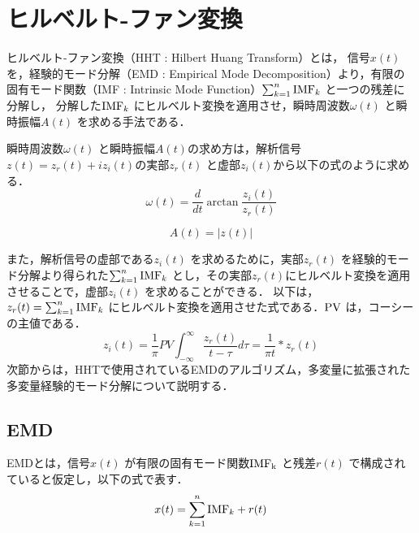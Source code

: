 \chapter{ヒルベルト-ファン変換}
%
ヒルベルト-ファン変換（HHT : Hilbert Huang Transform）とは，
信号$x(t)$ を，経験的モード分解（EMD : Empirical Mode Decomposition）より，有限の固有モード関数（IMF : Intrinsic Mode Function）$\sum_{k=1}^{n}{\rm{IMF}}_{k}$ と一つの残差に分解し，
分解した${\rm{IMF}}_{k}$ にヒルベルト変換を適用させ，瞬時周波数$\omega(t)$ と瞬時振幅$A(t)$ を求める手法である．
%

瞬時周波数$\omega(t)$ と瞬時振幅$A(t)$の求め方は，解析信号$z(t) = z_{r}(t) + iz_{i}(t)$の実部$z_{r}(t)$ と虚部$z_{i}(t)$から以下の式のように求める．
\begin{equation}
    \label{inst freq}
    \omega(t) = \frac{d}{dt}\arctan\frac{z_{i}(t)}{z_{r}(t)}
\end{equation}

\begin{equation}
    \label{inst amp}
    A(t) = |z(t)|
\end{equation}

また，解析信号の虚部である$z_{i}(t)$ を求めるために，実部$z_{r}(t)$ を経験的モード分解より得られた$\sum_{k=1}^{n}{\rm{IMF}}_{k}$ とし，その実部$z_{r}(t)$にヒルベルト変換を適用させることで，虚部$z_{i}(t)$ を求めることができる．
以下は，$z_{r}(t) = \sum_{k=1}^{n}{\rm{IMF}}_{k}$ にヒルベルト変換を適用させた式である．$\rm{PV}$ は，コーシーの主値である．
\begin{equation}
    z_{i}(t) = \frac{1}{\pi}PV \int_{-\infty}^{\infty} \frac{z_{r}(t)}{t - \tau} d \tau = \frac{1}{\pi t} * z_{r}(t)
\end{equation}
次節からは，HHTで使用されているEMDのアルゴリズム，多変量に拡張された多変量経験的モード分解について説明する．
%

\section{EMD}
%
EMDとは，信号$x(t)$ が有限の固有モード関数$\rm{IMF}_{k}$ と残差$r(t)$ で構成されていると仮定し，以下の式で表す．
\begin{equation}
    \label{emd}
    x(t) = \sum_{k=1}^{n} {\rm{IMF}}_{k} + r(t)
\end{equation}

